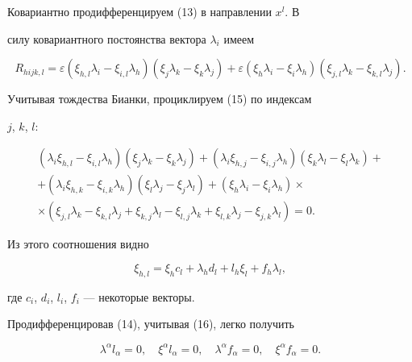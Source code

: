 Ковариантно продифференцируем (13) в направлении $x^l$. В


силу ковариантного постоянства вектора $\lambda_i$ имеем


\begin{equation}


R_{hijk,l}=\varepsilon (\xi_{h,l}\lambda_i-\xi_{i,l}\lambda_h)(\xi


_j\lambda_k-\xi_k\lambda_j)+


\varepsilon (\xi_h\lambda_i-\xi_i\lambda_h)(\xi_{j,l}\lambda_k-\xi


_{k,l}\lambda_j).


\end{equation}


Учитывая тождества Бианки, проциклируем (15) по индексам 


$j$, $k$, $l$:


\begin{multline*}


(\lambda_i\xi_{h,l}-\xi_{i,l}\lambda_h)(\xi_j\lambda_k-\xi_k\lambda_j)+


(\lambda_i\xi_{h,j}-\xi_{i,j}\lambda_h)(\xi_k\lambda_l-\xi_l\lambda


_k)+ \\


+(\lambda_i\xi_{h,k}-\xi_{i,k}\lambda_h)(\xi_l\lambda_j-\xi_j\lambda_l)+


(\xi_h\lambda_i-\xi_i\lambda_h)\times \\


\times (\xi_{j,l}\lambda_k-\xi_{k,l}\lambda_j+\xi_{k,j}\lambda_l-\xi_{l,j}


\lambda_k+\xi_{l,k}\lambda_j-\xi_{j,k}\lambda_l)=0.


\end{multline*}


Из этого соотношения видно


\begin{equation}


\xi_{h,l}=\xi_h c_l+\lambda_h d_l+l_h\xi_l+f_h\lambda_l,


\end{equation}


где $c_i$, $d_i$, $l_i$, $f_i$ --- некоторые векторы.





Продифференцировав (14), учитывая (16), легко получить


\begin{equation}


\lambda ^\alpha l_\alpha =0,\quad \xi ^\alpha l_\alpha =0,\quad 


\lambda ^\alpha f_\alpha =0,\quad \xi ^\alpha f_\alpha =0.


\end{equation}






